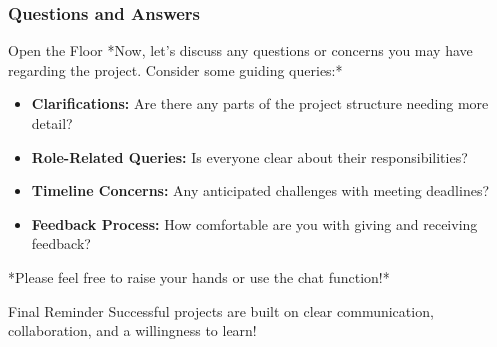 \documentclass[aspectratio=169]{beamer}
\begin{document}
\begin{frame}[fragile]
    \frametitle{Questions and Answers}
    
    \begin{block}{Open the Floor}
        *Now, let's discuss any questions or concerns you may have regarding the project. Consider some guiding queries:*
        \begin{itemize}
            \item \textbf{Clarifications:} Are there any parts of the project structure needing more detail?
            \item \textbf{Role-Related Queries:} Is everyone clear about their responsibilities?
            \item \textbf{Timeline Concerns:} Any anticipated challenges with meeting deadlines?
            \item \textbf{Feedback Process:} How comfortable are you with giving and receiving feedback?
        \end{itemize}
        *Please feel free to raise your hands or use the chat function!*
    \end{block}
    
    \begin{block}{Final Reminder}
        Successful projects are built on clear communication, collaboration, and a willingness to learn!
    \end{block}
\end{frame}
\end{document}
